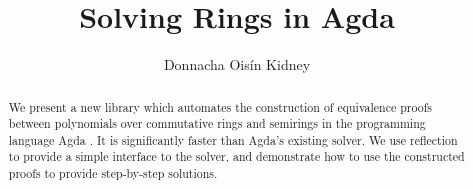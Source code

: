 \documentclass[acmsmall,anonymous]{acmart}\settopmatter{printfolios=true,printccs=false,printacmref=false}
\theoremstyle{remark}
\begin{document}
\title{Solving Rings in Agda}


\author{Donnacha Oisín Kidney}
\begin{abstract}
  We present a new library which automates the construction of equivalence
  proofs between polynomials over commutative rings and semirings in the
  programming language Agda \cite{norell_dependently_2008}. It is significantly
  faster than Agda's existing solver. We use reflection to provide a simple
  interface to the solver, and demonstrate how to use the constructed proofs to
  provide step-by-step solutions.
\end{abstract}


\end{document}
